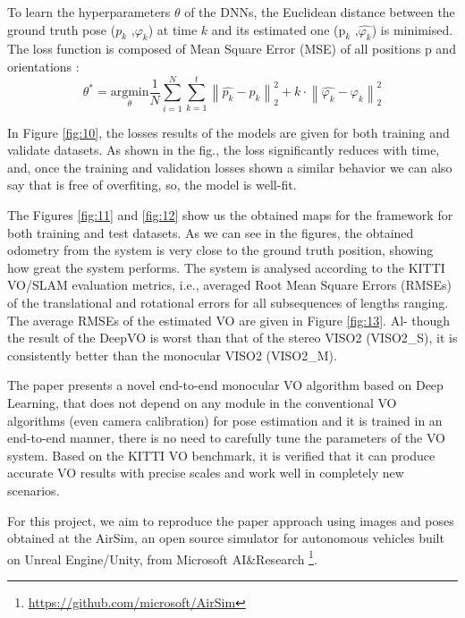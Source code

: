         To learn the hyperparameters $\theta$ of the DNNs, the Euclidean distance between the ground truth pose ($p_k$ ,$\varphi_k$) at time $k$ and its estimated one ($\text{\^{p}}_k$ ,$\hat{\varphi_k}$) is minimised. The loss function is composed of Mean Square Error (MSE) of all positions p and orientations :
        \begin{equation}
            \theta^* = \underset{\theta}{\mathrm{argmin}} \frac{1}{N} \sum_{i=1}^{N}\sum_{k=1}^{t} \left\| \hat{p_k} - p_k \right\|^{2}_2 + k \cdot \left\| \hat{\varphi_k} - \varphi_k \right\|^{2}_2
            \label{eq:MSE}
        \end{equation}
        
         In Figure \ref{fig:10}, the losses results of the models are given for both training and validate datasets. As shown in the fig., the loss significantly reduces with time, and, once the training and validation losses shown a similar behavior we can also say that is free of overfiting, so, the model is well-fit.
         
         The Figures \ref{fig:11} and \ref{fig:12} show us the obtained maps for the framework for both training and test datasets. As we can see in the figures, the obtained odometry from the system is very close to the ground truth position, showing how great the system performs. The system is analysed according to the KITTI VO/SLAM evaluation metrics, i.e., averaged Root Mean Square Errors (RMSEs) of the translational and rotational errors for all subsequences of lengths ranging. The average RMSEs of the estimated VO are given in Figure \ref{fig:13}. Al- though the result of the DeepVO is worst than that of the stereo VISO2 (VISO2\_S), it is consistently better than the monocular VISO2 (VISO2\_M).
         
         The paper presents a novel end-to-end monocular VO algorithm based on Deep Learning, that does not depend on any module in the conventional VO algorithms (even camera calibration) for pose estimation and it is trained in an end-to-end manner, there is no need to carefully tune the parameters of the VO system. Based on the KITTI VO benchmark, it is verified that it can produce accurate VO results with precise scales and work well in completely new scenarios.
         
         For this project, we aim to reproduce the paper approach using images and poses obtained at the AirSim, an open source simulator for autonomous vehicles built on Unreal Engine/Unity, from Microsoft AI\&Research \footnote{\label{ref:note1}\url{https://github.com/microsoft/AirSim}}.
         
